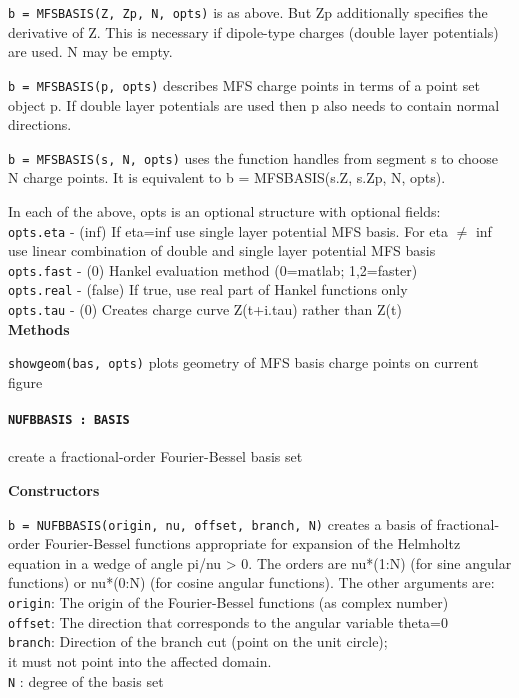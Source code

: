 {\tt b = MFSBASIS({Z, Zp}, N, opts)} is as above. But Zp additionally specifies
   the derivative of Z. This is necessary if dipole-type charges (double
   layer potentials) are used. N may be empty.

{\tt b = MFSBASIS(p, opts)} describes MFS charge points in terms of a point
   set object p. If double layer potentials are used then p also needs to
   contain normal directions.

{\tt b = MFSBASIS(s, N, opts)} uses the function handles from segment s to choose
   N charge points. It is equivalent to b = MFSBASIS({s.Z, s.Zp}, N, opts).

  In each of the above, opts is an optional structure with optional fields:\\
  {\tt opts.eta}   - (inf) If eta=inf use single layer potential MFS basis. For
               eta $\neq$ inf use linear combination of double and single layer
               potential MFS basis\\
  {\tt opts.fast}  - (0) Hankel evaluation method (0=matlab; 1,2=faster)\\
  {\tt opts.real}  - (false) If true, use real part of Hankel functions only\\
  {\tt opts.tau}   - (0) Creates charge curve Z(t+i.tau) rather than Z(t)\\

\textbf{Methods}

{\tt showgeom(bas, opts)} plots geometry of MFS basis charge points on current figure


\newpage

\paragraph{\tt NUFBBASIS : BASIS} create a fractional-order Fourier-Bessel
basis set

\textbf{Constructors}


{\tt b = NUFBBASIS(origin, nu, offset, branch, N)} creates a basis of
fractional- 
   order Fourier-Bessel functions appropriate for expansion of the Helmholtz
   equation in a wedge of angle pi/nu > 0. The orders are nu*(1:N) (for sine
   angular functions) or nu*(0:N) (for cosine angular functions). The other
   arguments are:\\ 
     {\tt origin}: The origin of the Fourier-Bessel functions (as complex number)\\
     {\tt offset}: The direction that corresponds to the angular variable theta=0\\
     {\tt branch}: Direction of the branch cut (point on the unit circle);\\
             it must not point into the affected domain.\\
     {\tt N}     : degree of the basis set

